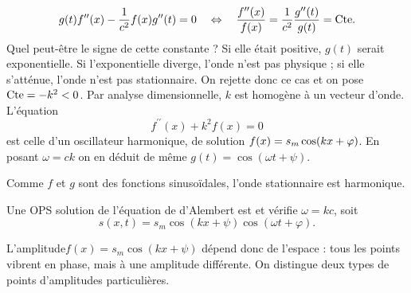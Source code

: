 \documentclass[12pt,fancy]{cours}
\begin{document}
\begin{demo}
\begin{equation}
  g(t)f^{\prime \prime}(x)-\frac{1}{c^2}f(x)g^{\prime \prime}(t)=0\quad\Leftrightarrow\quad \frac{f^{\prime \prime}(x)}{f(x)}=\frac{1}{c^2 }\frac{g^{\prime \prime}(t)}{g(t)}=\text{Cte}.
\end{equation}
Quel peut-être le signe de cette constante ? Si elle était positive, $g(t)$ serait exponentielle. Si l'exponentielle diverge, l'onde n'est pas physique ; si elle  s'atténue, l'onde n'est pas stationnaire. On rejette donc ce cas et on pose $\text{Cte} = -k^2 < 0$.  Par analyse dimensionnelle, $k$ est homogène à un vecteur d'onde. L'équation
\begin{equation}
  f^{\prime \prime}(x) +k^2 f(x) = 0
\end{equation}
est celle d'un oscillateur harmonique, de solution $f(x)=s_m\cos(kx+\varphi)$. En posant $\omega =ck$ on en déduit de même $g(t)=\cos(\omega t+\psi)$.
\end{demo}
Comme $f$ et $g$ sont des fonctions sinusoïdales, l'onde stationnaire est harmonique.
\begin{prop}\label{prop:}
  Une OPS solution de l'équation de d'Alembert est  et vérifie $\omega =k c $, soit
  \begin{equation*}
  s(x,t)=s_m\cos(kx+\psi)\cos(\omega t+\varphi).
\end{equation*}
\end{prop}


L'amplitude$f(x)=s_m\cos(kx+\psi)$ dépend donc de l'espace : tous les points vibrent en phase, mais à une amplitude différente. On distingue deux types de points d'amplitudes particulières.
\end{document}
